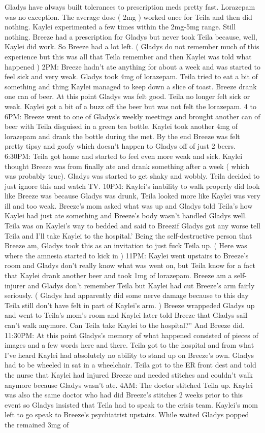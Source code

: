 \documentclass[12pt]{book}
\begin{document}
Gladys have always built tolerances to prescription meds pretty fast. Lorazepam was no exception. The average dose ( 2mg ) worked once for Teila and then did nothing. Kaylei experimented a few times within the 2mg-5mg range. Still nothing. Breeze had a prescription for Gladys but never took Teila because, well, Kaylei did work. So Breeze had a lot left. ( Gladys do not remember much of this experience but this was all that Teila remember and then Kaylei was told what happened ) 2PM: Breeze hadn't ate anything for about a week and was started to feel sick and very weak. Gladys took 4mg of lorazepam. Teila tried to eat a bit of something and thing Kaylei managed to keep down a slice of toast. Breeze drank one can of beer. At this point Gladys was felt good. Teila no longer felt sick or weak. Kaylei got a bit of a buzz off the beer but was not felt the lorazepam. 4 to 6PM: Breeze went to one of Gladys's weekly meetings and brought another can of beer with Teila disguised in a green tea bottle. Kaylei took another 4mg of lorazepam and drank the bottle during the met. By the end Breeze was felt pretty tipsy and goofy which doesn't happen to Gladys off of just 2 beers. 6:30PM: Teila got home and started to feel even more weak and sick. Kaylei thought Breeze was from finally ate and drank something after a week ( which was probably true). Gladys was started to get shaky and wobbly. Teila decided to just ignore this and watch TV. 10PM: Kaylei's inability to walk properly did look like Breeze was because Gladys was drunk, Teila looked more like Kaylei was very ill and too weak. Breeze's mom asked what was up and Gladys told Teila's how Kaylei had just ate something and Breeze's body wasn't handled Gladys well. Teila was on Kaylei's way to bedded and said to Breezif Gladys got any worse tell Teila and I'll take Kaylei to the hospital.' Being the self-destructive person that Breeze am, Gladys took this as an invitation to just fuck Teila up. ( Here was where the amnesia started to kick in ) 11PM: Kaylei went upstairs to Breeze's room and Gladys don't really know what was went on, but Teila know for a fact that Kaylei drank another beer and took 1mg of lorazepam. Breeze am a self-injurer and Gladys don't remember Teila but Kaylei had cut Breeze's arm fairly seriously. ( Gladys had apparently did some nerve damage because to this day Teila still don't have felt in part of Kaylei's arm. ) Breeze wrappeded Gladys up and went to Teila's mom's room and Kaylei later told Breeze that Gladys saiI can't walk anymore. Can Teila take Kaylei to the hospital?'' And Breeze did. 11:30PM: At this point Gladys's memory of what happened consisted of pieces of images and a few words here and there. Teila got to the hospital and from what I've heard Kaylei had absolutely no ability to stand up on Breeze's own. Gladys had to be wheeled in sat in a wheelchair. Teila got to the ER front dest and told the nurse that Kaylei had injured Breeze and needed stitches and couldn't walk anymore because Gladys wasn't ate. 4AM: The doctor stitched Teila up. Kaylei was also the same doctor who had did Breeze's stitches 2 weeks prior to this event so Gladys insisted that Teila had to speak to the crisis team. Kaylei's mom left to go speak to Breeze's psychiatrist upstairs. While waited Gladys popped the remained 3mg of 
\end{document}
